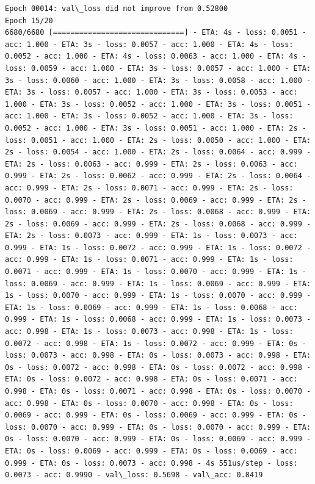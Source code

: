 \documentclass[11pt]{article}
\begin{document}
\begin{Verbatim}[commandchars=\\\{\}]
Epoch 00014: val\_loss did not improve from 0.52800
Epoch 15/20
6680/6680 [==============================] - ETA: 4s - loss: 0.0051 - acc: 1.000 - ETA: 3s - loss: 0.0057 - acc: 1.000 - ETA: 4s - loss: 0.0052 - acc: 1.000 - ETA: 4s - loss: 0.0063 - acc: 1.000 - ETA: 4s - loss: 0.0059 - acc: 1.000 - ETA: 3s - loss: 0.0057 - acc: 1.000 - ETA: 3s - loss: 0.0060 - acc: 1.000 - ETA: 3s - loss: 0.0058 - acc: 1.000 - ETA: 3s - loss: 0.0057 - acc: 1.000 - ETA: 3s - loss: 0.0053 - acc: 1.000 - ETA: 3s - loss: 0.0052 - acc: 1.000 - ETA: 3s - loss: 0.0051 - acc: 1.000 - ETA: 3s - loss: 0.0052 - acc: 1.000 - ETA: 3s - loss: 0.0052 - acc: 1.000 - ETA: 3s - loss: 0.0051 - acc: 1.000 - ETA: 2s - loss: 0.0051 - acc: 1.000 - ETA: 2s - loss: 0.0050 - acc: 1.000 - ETA: 2s - loss: 0.0054 - acc: 1.000 - ETA: 2s - loss: 0.0064 - acc: 0.999 - ETA: 2s - loss: 0.0063 - acc: 0.999 - ETA: 2s - loss: 0.0063 - acc: 0.999 - ETA: 2s - loss: 0.0062 - acc: 0.999 - ETA: 2s - loss: 0.0064 - acc: 0.999 - ETA: 2s - loss: 0.0071 - acc: 0.999 - ETA: 2s - loss: 0.0070 - acc: 0.999 - ETA: 2s - loss: 0.0069 - acc: 0.999 - ETA: 2s - loss: 0.0069 - acc: 0.999 - ETA: 2s - loss: 0.0068 - acc: 0.999 - ETA: 2s - loss: 0.0069 - acc: 0.999 - ETA: 2s - loss: 0.0068 - acc: 0.999 - ETA: 2s - loss: 0.0073 - acc: 0.999 - ETA: 1s - loss: 0.0073 - acc: 0.999 - ETA: 1s - loss: 0.0072 - acc: 0.999 - ETA: 1s - loss: 0.0072 - acc: 0.999 - ETA: 1s - loss: 0.0071 - acc: 0.999 - ETA: 1s - loss: 0.0071 - acc: 0.999 - ETA: 1s - loss: 0.0070 - acc: 0.999 - ETA: 1s - loss: 0.0069 - acc: 0.999 - ETA: 1s - loss: 0.0069 - acc: 0.999 - ETA: 1s - loss: 0.0070 - acc: 0.999 - ETA: 1s - loss: 0.0070 - acc: 0.999 - ETA: 1s - loss: 0.0069 - acc: 0.999 - ETA: 1s - loss: 0.0068 - acc: 0.999 - ETA: 1s - loss: 0.0068 - acc: 0.999 - ETA: 1s - loss: 0.0073 - acc: 0.998 - ETA: 1s - loss: 0.0073 - acc: 0.998 - ETA: 1s - loss: 0.0072 - acc: 0.998 - ETA: 1s - loss: 0.0072 - acc: 0.999 - ETA: 0s - loss: 0.0073 - acc: 0.998 - ETA: 0s - loss: 0.0073 - acc: 0.998 - ETA: 0s - loss: 0.0072 - acc: 0.998 - ETA: 0s - loss: 0.0072 - acc: 0.998 - ETA: 0s - loss: 0.0072 - acc: 0.998 - ETA: 0s - loss: 0.0071 - acc: 0.998 - ETA: 0s - loss: 0.0071 - acc: 0.998 - ETA: 0s - loss: 0.0070 - acc: 0.998 - ETA: 0s - loss: 0.0070 - acc: 0.998 - ETA: 0s - loss: 0.0069 - acc: 0.999 - ETA: 0s - loss: 0.0069 - acc: 0.999 - ETA: 0s - loss: 0.0070 - acc: 0.999 - ETA: 0s - loss: 0.0070 - acc: 0.999 - ETA: 0s - loss: 0.0070 - acc: 0.999 - ETA: 0s - loss: 0.0069 - acc: 0.999 - ETA: 0s - loss: 0.0069 - acc: 0.999 - ETA: 0s - loss: 0.0069 - acc: 0.999 - ETA: 0s - loss: 0.0073 - acc: 0.998 - 4s 551us/step - loss: 0.0073 - acc: 0.9990 - val\_loss: 0.5698 - val\_acc: 0.8419


\end{Verbatim}
\end{document}
